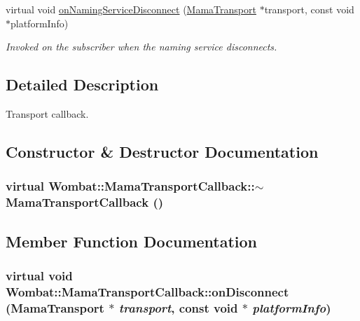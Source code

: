 \begin{DoxyCompactItemize}
virtual void \hyperlink{classWombat_1_1MamaTransportCallback_a51db398120915d5115e7c6be661e51c7}{onNamingServiceDisconnect} (\hyperlink{classWombat_1_1MamaTransport}{MamaTransport} $\ast$transport, const void $\ast$platformInfo)
\begin{DoxyCompactList}\small\item\em Invoked on the subscriber when the naming service disconnects. \item\end{DoxyCompactList}\end{DoxyCompactItemize}


\subsection{Detailed Description}
Transport callback. 

\subsection{Constructor \& Destructor Documentation}
\hypertarget{classWombat_1_1MamaTransportCallback_a6407795c8b962a42de85ed67c06483cc}{
\subsubsection[{$\sim$MamaTransportCallback}]{\setlength{\rightskip}{0pt plus 5cm}virtual Wombat::MamaTransportCallback::$\sim$MamaTransportCallback ()}}
\label{classWombat_1_1MamaTransportCallback_a6407795c8b962a42de85ed67c06483cc}


\subsection{Member Function Documentation}
\hypertarget{classWombat_1_1MamaTransportCallback_a911f774a4d7c1ae89e8e4afa0cce09a9}{
\subsubsection[{onDisconnect}]{\setlength{\rightskip}{0pt plus 5cm}virtual void Wombat::MamaTransportCallback::onDisconnect ({\bf MamaTransport} $\ast$ {\em transport}, \/  const void $\ast$ {\em platformInfo})}}
\label{classWombat_1_1MamaTransportCallback_a911f774a4d7c1ae89e8e4afa0cce09a9}


